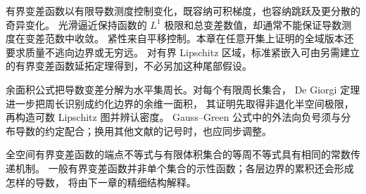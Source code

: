 






\begin{chaptersummary}
有界变差函数以有限导数测度控制变化，既容纳可积梯度，也容纳跳跃及更分散的奇异变化。
光滑逼近保持函数的 \(L^1\) 极限和总变差数值，却通常不能保证导数测度在变差范数中收敛。
紧性来自平移控制。本章在任意开集上证明的全域版本还要求质量不逃向边界或无穷远。
对有界 Lipschitz 区域，标准紧嵌入可由另需建立的有界变差函数延拓定理得到，不必另加这种尾部假设。

\ProseParagraphBreak

余面积公式把导数变差分解为水平集周长。对每个有限周长集合，
De Giorgi 定理进一步把周长识别成约化边界的余维一面积，
其证明先取得非退化半空间极限，再构造可数 Lipschitz 图并辨认密度。
Gauss–Green 公式中的外法向负号须与分布导数的约定配合；换用其他文献的记号时，也应同步调整。

\ProseParagraphBreak

全空间有界变差函数的端点不等式与有限体积集合的等周不等式具有相同的常数传递机制。
一般有界变差函数并非单个集合的示性函数；各层边界的累积还会形成怎样的导数，
将由下一章的精细结构解释。
\end{chaptersummary}

\BookExercises



